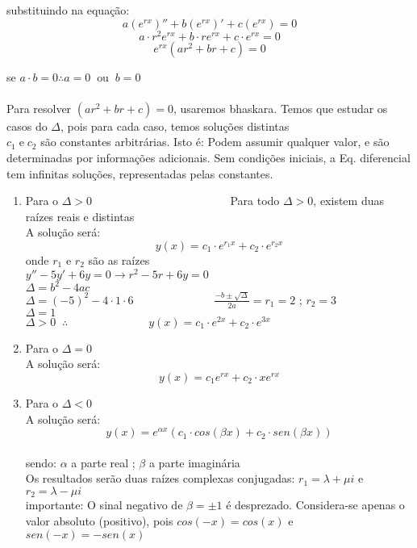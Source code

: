 \documentclass{article}
\begin{document}
{substituindo na equação:
\[a(e^{rx})''+b(e^{rx})'+c(e^{rx})=0\]
\[a\cdot r^2e^{rx}+b\cdot re^{rx}+c\cdot e^{rx}=0\]
\[e^{rx}(ar^2+br+c)=0\]


se $a\cdot b=0\therefore a=0 \;\;\text{ou} \;\;b=0$\\
\\

Para resolver $(ar^2+br+c)=0$, usaremos bhaskara.
Temos que estudar os casos do $\Delta$, pois para cada caso, temos soluções distintas\\
$c_1 \;\text{e} \;c_2$ são constantes arbitrárias. Isto é: Podem assumir qualquer valor, e são determinadas por informações adicionais. Sem condições iniciais, a Eq. diferencial tem infinitas soluções, representadas pelas constantes.\\

\begin{enumerate}
    \item Para o $\Delta > 0\hspace{5cm}$ {\small{Para todo $\Delta >0$, existem duas raízes reais e distintas}}\\
    A solução será:\[\boxed{y(x)=c_1\cdot e^{r_1x}+c_2\cdot e^{r_2x}}\]
    onde $r_1$ e $r_2$ são as raízes\\
    
    $y''-5y'+6y =0\xrightarrow{\;}r^2-5r+6y=0$\\
    $\Delta= b^2-4ac$\\
    $\displaystyle\Delta = (-5)^2-4\cdot 1\cdot 6\hspace{3cm} \frac{-b\pm \sqrt{\Delta}}{2a}=r_1=2$ \;;\; $r_2=3$\\
    $\Delta=1$\\
    $\displaystyle \Delta >0 \;\;\therefore \hspace{3cm} y(x)=c_1\cdot e^{2x}+c_2\cdot e^{3x}$
\newpage
    \item Para o $\Delta =0$\\
    A solução será:
    \[\boxed{y(x)=c_1 e^{rx}+c_2\cdot xe^{rx}}\]

    \item  Para o $\Delta <0$\\
    A solução será:\\
    \[\boxed{y(x)= e^{\alpha x}(c_1\cdot cos(\beta x) + c_2\cdot  sen(\beta x))}\]\\
    sendo: $\alpha$ a parte real \;\; ;\;\; $\beta$ a parte imaginária\\
    Os resultados serão duas raízes complexas conjugadas:\;\;
    \;\;\;\;\;\;\; $r_1=\lambda + \mu i$ \;\; e \;\; $r_2=\lambda - \mu i$\\
    importante: O sinal negativo de $\beta=\pm 1$ é desprezado. Considera-se apenas o valor absoluto (positivo), pois $cos(-x)=cos(x)$ e $sen(-x)=-sen(x)$\\


\end{enumerate}}
\end{document}
